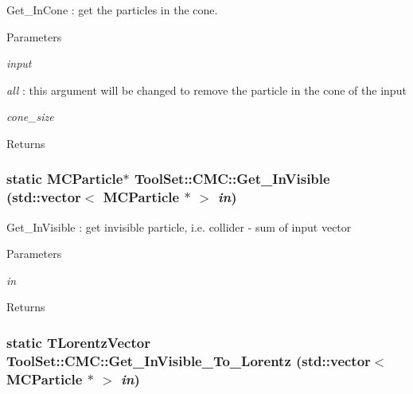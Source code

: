 Get\_\-InCone : get the particles in the cone. 
\begin{DoxyParams}{Parameters}
\item[{\em input}]\item[{\em all}]: this argument will be changed to remove the particle in the cone of the input \item[{\em cone\_\-size}]\end{DoxyParams}
\begin{DoxyReturn}{Returns}

\end{DoxyReturn}
\hypertarget{classToolSet_1_1CMC_a89441427db18fc75e777966d5ac169b7}{
\subsubsection[{Get\_\-InVisible}]{\setlength{\rightskip}{0pt plus 5cm}static MCParticle$\ast$ ToolSet::CMC::Get\_\-InVisible (std::vector$<$ MCParticle $\ast$ $>$ {\em in})}}
\label{classToolSet_1_1CMC_a89441427db18fc75e777966d5ac169b7}


Get\_\-InVisible : get invisible particle, i.e. collider -\/ sum of input vector


\begin{DoxyParams}{Parameters}
\item[{\em in}]\end{DoxyParams}
\begin{DoxyReturn}{Returns}

\end{DoxyReturn}
\hypertarget{classToolSet_1_1CMC_ab44cceb872950622551735a97a23bd4d}{
\subsubsection[{Get\_\-InVisible\_\-To\_\-Lorentz}]{\setlength{\rightskip}{0pt plus 5cm}static TLorentzVector ToolSet::CMC::Get\_\-InVisible\_\-To\_\-Lorentz (std::vector$<$ MCParticle $\ast$ $>$ {\em in})}}
\label{classToolSet_1_1CMC_ab44cceb872950622551735a97a23bd4d}


